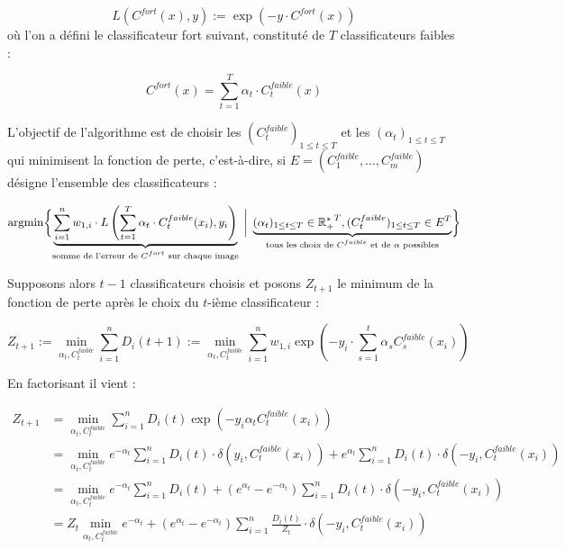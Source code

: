 \documentclass[12pt,a4paper]{article}
\DeclareMathOperator*{\argmin}{argmin}
\begin{document}
\begin{equation}
    L(C^{fort}(x), y) := \exp(-y \cdot C^{fort}(x))
\end{equation}
où l'on a défini le classificateur fort suivant, constituté de $T$ classificateurs faibles :

\[
    C^{fort}(x) = \sum_{t=1}^T \alpha_t \cdot C_t^{faible}(x)
\]

L'objectif de l'algorithme est de choisir les $(C_t^{faible})_{1 \leq t \leq T}$ et les $(\alpha_t)_{1 \leq t \leq T}$ qui minimisent la fonction de perte, c'est-à-dire, si $E = (C_1^{faible}, ..., C_m^{faible})$ désigne l'ensemble des classificateurs :

\[
    \argmin \biggl\{ 
    \underbrace{
        \sum_{i=1}^n w_{1, i} \cdot L\left(\sum_{t=1}^T \alpha_t \cdot C_t^{faible}(x_i), y_i\right) 
    }_{
        \textnormal{somme de l'erreur de $C^{fort}$ sur chaque image}
    }
    \; \bigg| \; 
    \underbrace{
        {(\alpha_t)_{1 \leq t \leq T} \in \mathbb{R_+^*}^T,(C_t^{faible})_{1 \leq t \leq T} \in E^T} 
        }_{
            \textnormal{tous les choix de $C^{faible}$ et de $\alpha$ possibles}
            }
    \biggr\}
\]

Supposons alors $t-1$ classificateurs choisis et posons $Z_{t+1}$ le minimum de la fonction de perte après le choix du $t$-ième classificateur :

\begin{equation}
    Z_{t+1} 
    := \min_{\alpha_t, C_t^{faible}} \sum_{i=1}^n D_i(t+1) 
    := \min_{\alpha_t, C_t^{faible}} \sum_{i=1}^n w_{1, i} \exp\left(-y_i \cdot \sum_{s=1}^t \alpha_s C_s^{faible}(x_i)\right)
\end{equation}

En factorisant il vient :

\begin{equation*}
\begin{split}
    Z_{t+1}  & = \min_{\alpha_t, C_t^{faible}} \sum_{i=1}^n D_i(t) \exp\left(-y_i \alpha_t C_t^{faible}(x_i)\right) \\
    & = \min_{\alpha_t, C_t^{faible}} e^{-\alpha_t} \sum_{i=1}^n D_i(t) \cdot \delta(y_i, C_t^{faible}(x_i)) + e^{\alpha_t} \sum_{i=1}^n D_i(t) \cdot \delta(-y_i, C_t^{faible}(x_i)) \\
    & = \min_{\alpha_t, C_t^{faible}} e^{-\alpha_t} \sum_{i=1}^n D_i(t)  + (e^{\alpha_t} - e^{-\alpha_t}) \sum_{i=1}^n D_i(t) \cdot \delta(-y_i, C_t^{faible}(x_i)) \\
    & = Z_t \min_{\alpha_t, C_t^{faible}} e^{-\alpha_t}  + (e^{\alpha_t} - e^{-\alpha_t}) \sum_{i=1}^n \frac{D_i(t)}{Z_t} \cdot \delta(-y_i, C_t^{faible}(x_i))
\end{split}
\end{equation*}
\end{document}
